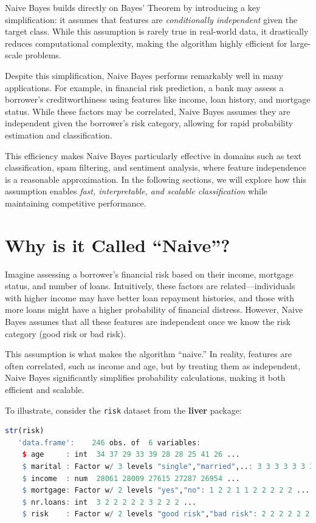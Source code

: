 \documentclass[
]{book}
\newcommand{\passthrough}[1]{#1}
\theoremstyle{definition}
\theoremstyle{definition}
\theoremstyle{definition}
\theoremstyle{definition}
\theoremstyle{remark}
\begin{document}
Naive Bayes builds directly on Bayes' Theorem by introducing a key simplification: it assumes that features are \emph{conditionally independent} given the target class. While this assumption is rarely true in real-world data, it drastically reduces computational complexity, making the algorithm highly efficient for large-scale problems.

Despite this simplification, Naive Bayes performs remarkably well in many applications. For example, in financial risk prediction, a bank may assess a borrower's creditworthiness using features like income, loan history, and mortgage status. While these factors may be correlated, Naive Bayes assumes they are independent given the borrower's risk category, allowing for rapid probability estimation and classification.

This efficiency makes Naive Bayes particularly effective in domains such as text classification, spam filtering, and sentiment analysis, where feature independence is a reasonable approximation. In the following sections, we will explore how this assumption enables \emph{fast, interpretable, and scalable classification} while maintaining competitive performance.

\section{Why is it Called ``Naive''?}\label{why-is-it-called-naive}

Imagine assessing a borrower's financial risk based on their income, mortgage status, and number of loans. Intuitively, these factors are related---individuals with higher income may have better loan repayment histories, and those with more loans might have a higher probability of financial distress. However, Naive Bayes assumes that all these features are independent once we know the risk category (good risk or bad risk).

This assumption is what makes the algorithm ``naive.'' In reality, features are often correlated, such as income and age, but by treating them as independent, Naive Bayes significantly simplifies probability calculations, making it both efficient and scalable.

To illustrate, consider the \passthrough{\lstinline!risk!} dataset from the \textbf{liver} package:

\begin{lstlisting}[language=R]
str(risk)
   'data.frame':    246 obs. of  6 variables:
    $ age     : int  34 37 29 33 39 28 28 25 41 26 ...
    $ marital : Factor w/ 3 levels "single","married",..: 3 3 3 3 3 3 3 3 3 3 ...
    $ income  : num  28061 28009 27615 27287 26954 ...
    $ mortgage: Factor w/ 2 levels "yes","no": 1 2 2 1 1 2 2 2 2 2 ...
    $ nr.loans: int  3 2 2 2 2 2 3 2 2 2 ...
    $ risk    : Factor w/ 2 levels "good risk","bad risk": 2 2 2 2 2 2 2 2 2 2 ...
\end{lstlisting}
\end{document}

